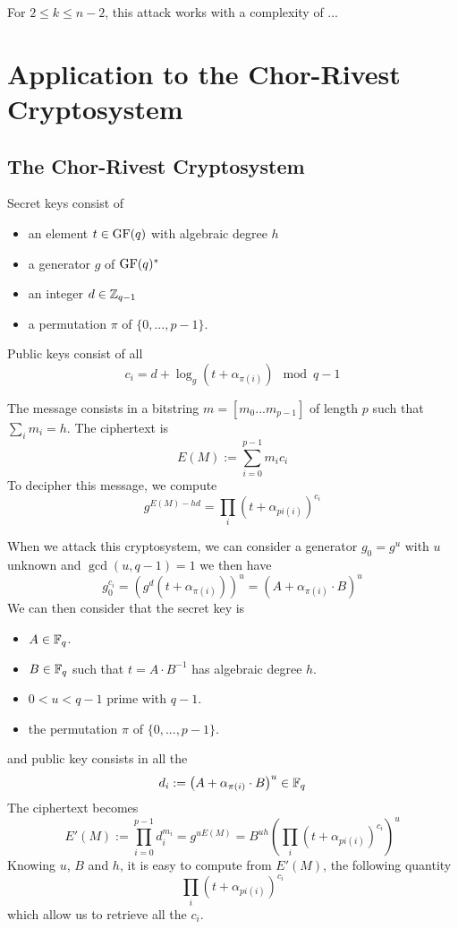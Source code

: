 \documentclass[12pt,a4paper,titlepage]{article}
\begin{document}
For $2 \leq k \leq n-2$, this attack works with a complexity of ...


\section{Application to the Chor-Rivest Cryptosystem}

\subsection{The Chor-Rivest Cryptosystem}

Secret keys consist of
\begin{itemize}
\item an element $t \in \text{GF}(q)$ with algebraic degree $h$
\item a generator $g$ of $\text{GF} (q)^{\ast} $
\item an integer $d \in \mathbb{Z}_{q-1} $
\item a permutation $\pi$ of $\{ 0, ... , p-1 \}$.
\end{itemize}

Public keys consist of all
$$ c_i = d + \log_g(t + \alpha_{\pi(i)}) \mod q-1 $$

The message consists in a bitstring $m = [m_0...m_{p-1}]$ of length $p$ such that $\sum_i m_i = h$. The ciphertext is
$$ E(M) := \sum_{i=0}^{p-1} m_i c_i$$
To decipher this message, we compute
$$ g^{E(M) - hd} =  \prod_i \left( t + \alpha_{pi(i)}\right)^{c_i} $$




When we attack this cryptosystem, we can consider a generator $g_0 = g^u$ with $u$ unknown and $\gcd(u, q-1) = 1$ we then have
$$ g_0^{c_i} = \left( g^d \left( t + \alpha_{\pi(i)} \right) \right)^u = \left(A + \alpha_{\pi(i)} \cdot B\right)^u$$
We can then consider that the secret key is
\begin{itemize}
\item $A \in \mathbb{F}_q$.
\item $B \in \mathbb{F}_q$ such that $t = A\cdot B^{-1}$ has algebraic degree $h$.
\item $0 < u < q-1$ prime with $q-1$.
\item the permutation $\pi$ of $\{ 0, ... , p-1 \}$.
\end{itemize}
and public key consists in all the
$$ d_i := \left(A + \alpha_{\pi(i)} \cdot B\right)^u \in \mathbb{F}_q$$
The ciphertext becomes
$$ E'(M) := \prod_{i=0}^{p-1} d_i^{m_i} = g^{uE(M)} = B^{uh} \left( \prod_i \left( t + \alpha_{pi(i)}\right)^{c_i} \right)^u$$
Knowing $u$, $B$ and $h$, it is easy to compute from $E'(M)$, the following quantity
$$ \prod_i \left( t + \alpha_{pi(i)}\right)^{c_i} $$
which allow us to retrieve all the $c_i$.
\end{document}
